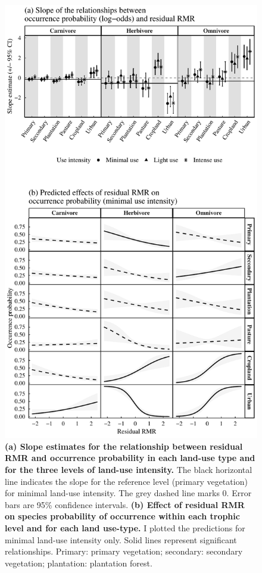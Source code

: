 \begin{figure}[h!]
\centering
\includegraphics[scale=0.65]{figures/Chapter5/Figure4}
\caption[Slope estimates and predictions for the relationship between occurrence probability and residual RMR]{\textbf{(a) Slope estimates for the relationship between residual RMR and occurrence probability in each land-use type and for the three levels of land-use intensity.} The black horizontal line indicates the slope for the reference level (primary vegetation) for minimal land-use intensity. The grey dashed line marks 0. Error bars are 95\% confidence intervals. \textbf{(b) Effect of residual RMR on species probability of occurrence within each trophic level and for each land use-type.} I plotted the predictions for minimal land-use intensity only. Solid lines represent significant relationships. Primary: primary vegetation; secondary: secondary vegetation; plantation: plantation forest.}
\label{chap5_fig4}
\end{figure}

